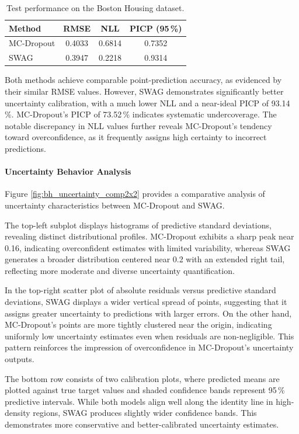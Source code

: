 \begin{table}[h!]
\centering
\begin{tabular}{lccc}
\toprule
Method & RMSE & NLL & PICP (95\,\%) \\
\midrule
MC-Dropout & 0.4033 & 0.6814 & 0.7352 \\
SWAG       & 0.3947 & 0.2218 & 0.9314 \\
\bottomrule
\end{tabular}
\caption{Test performance on the Boston Housing dataset.}
\label{tab:bh_metrics}
\end{table}

Both methods achieve comparable point-prediction accuracy, as evidenced by their similar RMSE values.
However, SWAG demonstrates significantly better uncertainty calibration, with a much lower NLL and a
near-ideal PICP of 93.14\,\%. MC-Dropout's PICP of 73.52\,\% indicates systematic undercoverage.
The notable discrepancy in NLL values further reveals MC-Dropout's tendency toward overconfidence,
as it frequently assigns high certainty to incorrect predictions.


\paragraph{Uncertainty Behavior Analysis}
Figure \ref{fig:bh_uncertainty_comp2x2} provides a comparative analysis of uncertainty characteristics between MC-Dropout and SWAG.

The top-left subplot displays histograms of predictive standard deviations, revealing distinct
distributional profiles. MC-Dropout exhibits a sharp peak near 0.16, indicating overconfident estimates
with limited variability, whereas SWAG generates a broader distribution centered near 0.2 with an
extended right tail, reflecting more moderate and diverse uncertainty quantification.

In the top-right scatter plot of absolute residuals versus predictive standard deviations, SWAG displays a
wider vertical spread of points, suggesting that it assigns greater uncertainty to predictions with larger
errors. On the other hand, MC-Dropout's points are more tightly clustered near the origin, indicating
uniformly low uncertainty estimates even when residuals are non-negligible. This pattern reinforces the
impression of overconfidence in MC-Dropout's uncertainty outputs.

The bottom row consists of two calibration plots, where predicted means are plotted against true target
values and shaded confidence bands represent 95\,\% predictive intervals. While both models align well
along the identity line in high-density regions, SWAG produces slightly wider confidence bands. This
demonstrates more conservative and better-calibrated uncertainty estimates.

